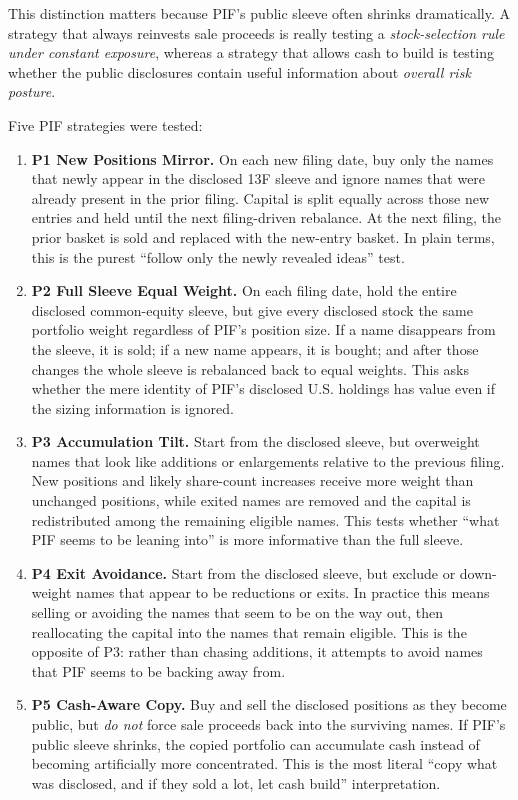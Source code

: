 \documentclass[conference]{IEEEtran}
\begin{document}
This distinction matters because PIF's public sleeve often shrinks dramatically. A strategy that always reinvests sale proceeds is really testing a \emph{stock-selection rule under constant exposure}, whereas a strategy that allows cash to build is testing whether the public disclosures contain useful information about \emph{overall risk posture}.

Five PIF strategies were tested:
\begin{enumerate}[leftmargin=1.4em]
    \item \textbf{P1 New Positions Mirror.} On each new filing date, buy only the names that newly appear in the disclosed 13F sleeve and ignore names that were already present in the prior filing. Capital is split equally across those new entries and held until the next filing-driven rebalance. At the next filing, the prior basket is sold and replaced with the new-entry basket. In plain terms, this is the purest ``follow only the newly revealed ideas'' test.
    \item \textbf{P2 Full Sleeve Equal Weight.} On each filing date, hold the entire disclosed common-equity sleeve, but give every disclosed stock the same portfolio weight regardless of PIF's position size. If a name disappears from the sleeve, it is sold; if a new name appears, it is bought; and after those changes the whole sleeve is rebalanced back to equal weights. This asks whether the mere identity of PIF's disclosed U.S. holdings has value even if the sizing information is ignored.
    \item \textbf{P3 Accumulation Tilt.} Start from the disclosed sleeve, but overweight names that look like additions or enlargements relative to the previous filing. New positions and likely share-count increases receive more weight than unchanged positions, while exited names are removed and the capital is redistributed among the remaining eligible names. This tests whether ``what PIF seems to be leaning into'' is more informative than the full sleeve.
    \item \textbf{P4 Exit Avoidance.} Start from the disclosed sleeve, but exclude or down-weight names that appear to be reductions or exits. In practice this means selling or avoiding the names that seem to be on the way out, then reallocating the capital into the names that remain eligible. This is the opposite of P3: rather than chasing additions, it attempts to avoid names that PIF seems to be backing away from.
    \item \textbf{P5 Cash-Aware Copy.} Buy and sell the disclosed positions as they become public, but \emph{do not} force sale proceeds back into the surviving names. If PIF's public sleeve shrinks, the copied portfolio can accumulate cash instead of becoming artificially more concentrated. This is the most literal ``copy what was disclosed, and if they sold a lot, let cash build'' interpretation.
\end{enumerate}
\end{document}
